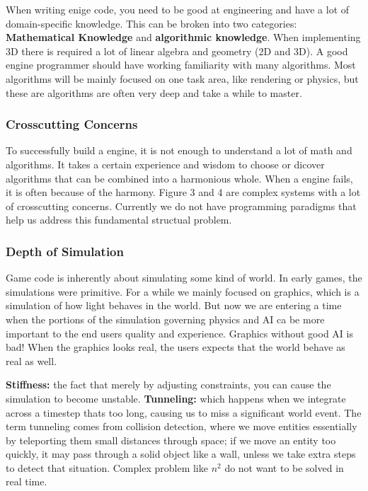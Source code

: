     When writing enige code, you need to be good at engineering and have a lot of domain-specific knowledge. This can be broken into two categories: {\bf Mathematical Knowledge} and {\bf algorithmic knowledge}. When implementing 3D there is required a lot of linear algebra and geometry (2D and 3D). A good engine programmer should have working familiarity with many algorithms. Most algorithms will be mainly focused on one task area, like rendering or physics, but these are algorithms are often very deep and take a while to master. 

    \subsubsection*{Crosscutting Concerns}
    To successfully build a engine, it is not enough to understand a lot of math and algorithms. It takes a certain experience and wisdom to choose or dicover algorithms that can be combined into a harmonious whole. When a engine fails, it is often because of the harmony. Figure 3 and 4 are complex systems with a lot of crosscutting concerns. Currently we do not have programming paradigms that help us address this fundamental structual problem.

    \subsubsection*{Depth of Simulation}
    Game code is inherently about simulating some kind of world. In early games, the simulations were primitive. For a while we mainly focused on graphics, which is a simulation of how light behaves in the world. But now we are entering a time when the portions of the simulation governing physics and AI ca be more important to the end users quality and experience. Graphics without good AI is bad! When the graphics looks real, the users expects that the world behave as real as well.

    {\bf Stiffness:} the fact that merely by adjusting constraints, you can cause the simulation to become unstable.
    {\bf Tunneling:} which happens when we integrate across a timestep thats too long, causing us to miss a significant world event. The term tunneling comes from collision detection, where we move entities essentially by teleporting them small distances through space; if we move an entity too quickly, it may pass through a solid object like a wall, unless we take extra steps to detect that situation. Complex problem like $n^{2}$ do not want to be solved in real time. 

